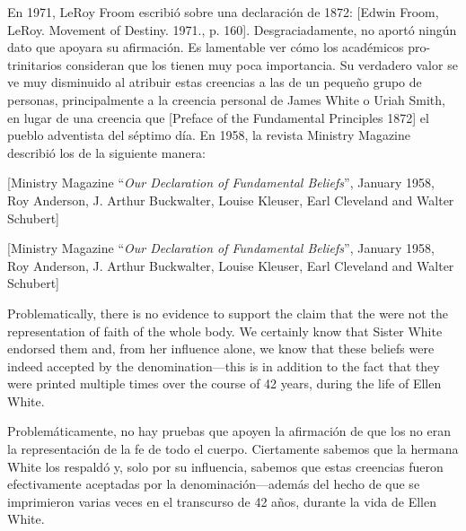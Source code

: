 En 1971, LeRoy Froom escribió sobre una declaración de 1872: [Edwin Froom, LeRoy. Movement of Destiny. 1971., p. 160]. Desgraciadamente, no aportó ningún dato que apoyara su afirmación. Es lamentable ver cómo los académicos pro-trinitarios consideran que los  tienen muy poca importancia. Su verdadero valor se ve muy disminuido al atribuir estas creencias a las de un pequeño grupo de personas, principalmente a la creencia personal de James White o Uriah Smith, en lugar de una creencia que [Preface of the Fundamental Principles 1872] el pueblo adventista del séptimo día. En 1958, la revista Ministry Magazine describió los  de la siguiente manera:


[Ministry Magazine “\textit{Our Declaration of Fundamental Beliefs}”, January 1958, Roy Anderson, J. Arthur Buckwalter, Louise Kleuser, Earl Cleveland and Walter Schubert]


[Ministry Magazine “\textit{Our Declaration of Fundamental Beliefs}”, January 1958, Roy Anderson, J. Arthur Buckwalter, Louise Kleuser, Earl Cleveland and Walter Schubert]


Problematically, there is no evidence to support the claim that the  were not the representation of faith of the whole body. We certainly know that Sister White endorsed them and, from her influence alone, we know that these beliefs were indeed accepted by the denomination—this is in addition to the fact that they were printed multiple times over the course of 42 years, during the life of Ellen White.


Problemáticamente, no hay pruebas que apoyen la afirmación de que los  no eran la representación de la fe de todo el cuerpo. Ciertamente sabemos que la hermana White los respaldó y, solo por su influencia, sabemos que estas creencias fueron efectivamente aceptadas por la denominación—además del hecho de que se imprimieron varias veces en el transcurso de 42 años, durante la vida de Ellen White.



